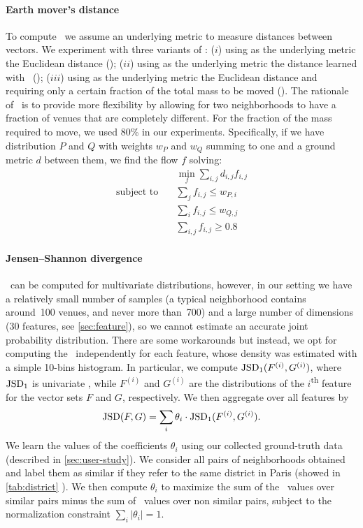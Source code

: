\paragraph{Earth mover's distance}
To compute \emd\ we assume an underlying metric to measure
distances between vectors.
We experiment with three variants of \emd:
($i$) using as the underlying metric the Euclidean distance (\emde); 
($ii$) using as the underlying metric the distance learned with \lmnn\ (\emdl); 
($iii$) using as the underlying metric the Euclidean distance and
requiring only a certain fraction of the total mass to be moved
(\emdp).
The rationale of \emdp\ is to provide more flexibility by allowing for two
neighborhoods to have a fraction of venues that are completely different.  For
the fraction of the mass required to move, we used 80\% in our experiments.
Specifically, if we have distribution $P$ and $Q$ with weights $w_P$ and $w_Q$
summing to one and a ground metric $d$ between them, we find the flow $f$
solving:
\begin{align*}
	&\quad \underset{f}{\min} \sum_{i,j} d_{i,j} f_{i,j} \\
	\text{subject to} &\quad \sum_j f_{i,j} \leq w_{P,i} \\
	&\quad \sum_i f_{i,j} \leq w_{Q,j} \\
	&\quad \sum_{i,j} f_{i,j} \geq 0.8 
\end{align*}

\paragraph{Jensen--Shannon divergence}
\jsd\ can be computed for multivariate distributions, 
however, in our setting we have a relatively small number of samples
(a typical neighborhood contains around~100 venues, and never more
than~700) and a large number of dimensions ($30$ features, see 
\autoref{sec:feature}), 
so we cannot estimate an accurate joint probability distribution.
There are some workarounds \autocite{EstimateKL07} but instead,
we opt for computing the \jsd\ independently for each feature, whose density
was estimated with a simple 10-bins histogram. 
In particular, we compute
$\mathrm{{JSD}}_1(F^{(i)},G^{(i)})$,  
where  
$\mathrm{{JSD}}_1$ is univariate \jsd, while 
$F^{(i)}$ and $G^{(i)}$ are the distributions of the $i$\textsuperscript{th} feature for
the vector sets $F$ and $G$, respectively.
We then aggregate over all features by
\begin{equation}
\label{equation:jsd}
\mathrm{{JSD}}(F,G) = 
\sum_{i} \theta_i \cdot\mathrm{{JSD}}_1(F^{(i)},G^{(i)}).
\end{equation}
We learn the values of the coefficients $\theta_i$ using our collected
ground-truth data (described in \autoref{sec:user-study}). We consider all
pairs of neighborhoods obtained and label them as similar if they refer to the
same district in Paris (showed in \autoref{tab:district}
\pageref{tab:district}). We then compute $\theta_i$ to maximize the sum of the
\jsd\ values over similar pairs minus the sum of \jsd\ values over non similar
pairs, subject to the normalization constraint $\sum_i |\theta_i| =1$.

